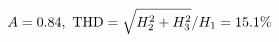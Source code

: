 \documentclass[preview]{standalone}
\begin{document}
\begin{align*}
\special{dvisvgm:raw <g id='unique000'>}A=0.84,\ \text{THD}=\sqrt{H_2^2+H_3^2}/H_1=15.1\%\special{dvisvgm:raw </g>}
\end{align*}
\end{document}

